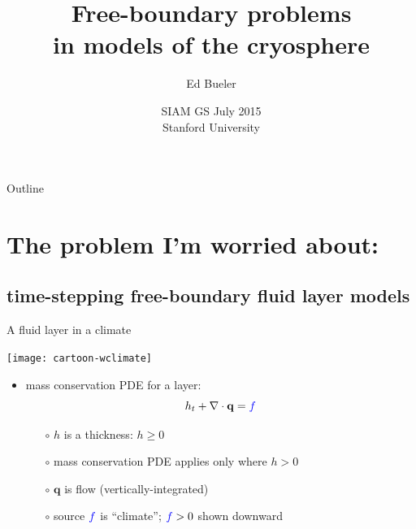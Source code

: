 \documentclass{beamer}
\title[Free-boundary problems in cryosphere]{Free-boundary problems \\ in models of the cryosphere}
\author{Ed Bueler}
\institute[UAF] %
{
  Dept of Mathematics and Statistics, and Geophysical Institute\\
  University of Alaska Fairbanks \\
  \tiny (\emph{funded by NASA Modeling, Analysis, and Prediction program})%
}
\date[SIAM GS 2015]{SIAM GS July 2015 \\ Stanford University}
\newcommand\bq{\mathbf{q}}
\newcommand{\Div}{\nabla\cdot}
\begin{document}
\graphicspath{{../cartoon/}{../refinemass/}{../../images/}{../../../talks-public/commonfigs/}}

\begin{frame}
  \titlepage
\end{frame}

\begin{frame}{Outline}
  \tableofcontents
\end{frame}


\section{The problem I'm worried about:}

\subsection{time-stepping free-boundary fluid layer models}

\begin{frame}{A fluid layer in a climate}

\begin{center}
\texttt{[image: cartoon-wclimate]}
\end{center}

\vspace{-7mm}
  \begin{itemize}
  \item mass conservation PDE for a layer:
      $$h_t + \Div\bq = {\color{blue} f}$$
    \begin{itemize}
    \vspace{-4mm}
    \item[$\circ$] $h$ is a thickness: $h\ge 0$
    \item[$\circ$] mass conservation PDE applies only where $h>0$
    \item[$\circ$] $\bq$ is flow (vertically-integrated)
    \item[$\circ$] source ${\color{blue} f}$ is ``climate''; ${\color{blue} f}>0$ shown downward
    \end{itemize}
  \end{itemize}
\end{frame}
\end{document}
